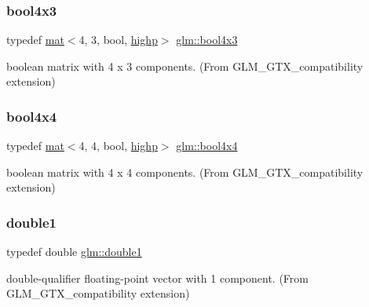 \subsubsection{\texorpdfstring{bool4x3}{bool4x3}}
{\footnotesize\ttfamily typedef \hyperlink{structglm_1_1mat}{mat}$<$4, 3, bool, \hyperlink{namespaceglm_a36ed105b07c7746804d7fdc7cc90ff25ac6f7eab42eacbb10d59a58e95e362074}{highp}$>$ \hyperlink{group__gtx__compatibility_gab1a5519fb12e67d9940fa4d9b4590198}{glm\+::bool4x3}}



boolean matrix with 4 x 3 components. (From G\+L\+M\+\_\+\+G\+T\+X\+\_\+compatibility extension) 

\mbox{\label{group__gtx__compatibility_ga568a1c97a6c6f7253334ee5933a6cb77}} 
\subsubsection{\texorpdfstring{bool4x4}{bool4x4}}
{\footnotesize\ttfamily typedef \hyperlink{structglm_1_1mat}{mat}$<$4, 4, bool, \hyperlink{namespaceglm_a36ed105b07c7746804d7fdc7cc90ff25ac6f7eab42eacbb10d59a58e95e362074}{highp}$>$ \hyperlink{group__gtx__compatibility_ga568a1c97a6c6f7253334ee5933a6cb77}{glm\+::bool4x4}}



boolean matrix with 4 x 4 components. (From G\+L\+M\+\_\+\+G\+T\+X\+\_\+compatibility extension) 

\mbox{\label{group__gtx__compatibility_gab8b88350212cea916857cb2f49b8a29f}} 
\subsubsection{\texorpdfstring{double1}{double1}}
{\footnotesize\ttfamily typedef double \hyperlink{group__gtx__compatibility_gab8b88350212cea916857cb2f49b8a29f}{glm\+::double1}}



double-\/qualifier floating-\/point vector with 1 component. (From G\+L\+M\+\_\+\+G\+T\+X\+\_\+compatibility extension) 

